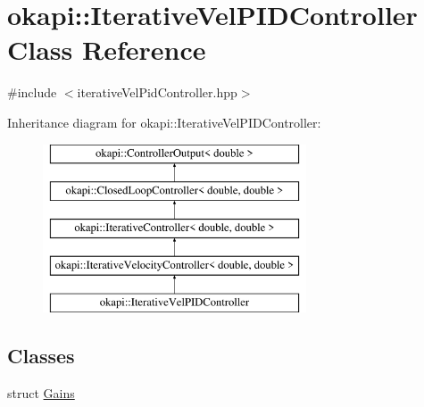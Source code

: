 \hypertarget{classokapi_1_1IterativeVelPIDController}{}\section{okapi\+::Iterative\+Vel\+P\+I\+D\+Controller Class Reference}
\label{classokapi_1_1IterativeVelPIDController}


{\ttfamily \#include $<$iterative\+Vel\+Pid\+Controller.\+hpp$>$}

Inheritance diagram for okapi\+::Iterative\+Vel\+P\+I\+D\+Controller\+:\begin{figure}[H]
\begin{center}
\leavevmode
\includegraphics[height=5.000000cm]{classokapi_1_1IterativeVelPIDController}
\end{center}
\end{figure}
\subsection*{Classes}
\begin{DoxyCompactItemize}
\item 
struct \mbox{\hyperlink{structokapi_1_1IterativeVelPIDController_1_1Gains}{Gains}}
\end{DoxyCompactItemize}

